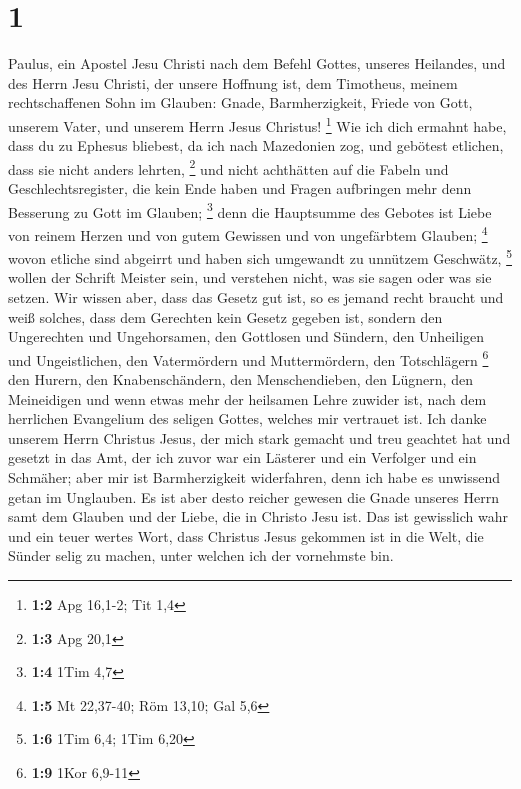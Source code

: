 \hypertarget{section}{%
\section{1}\label{section}}

 Paulus, ein Apostel Jesu Christi nach dem Befehl Gottes,
unseres Heilandes, und des Herrn Jesu Christi, der unsere Hoffnung ist,
 dem Timotheus, meinem rechtschaffenen Sohn im Glauben:
Gnade, Barmherzigkeit, Friede von Gott, unserem Vater, und unserem Herrn
Jesus Christus! \footnote{\textbf{1:2} Apg 16,1-2; Tit 1,4}
 Wie ich dich ermahnt habe, dass du zu Ephesus bliebest,
da ich nach Mazedonien zog, und gebötest etlichen, dass sie nicht anders
lehrten, \footnote{\textbf{1:3} Apg 20,1}  und nicht
achthätten auf die Fabeln und Geschlechtsregister, die kein Ende haben
und Fragen aufbringen mehr denn Besserung zu Gott im Glauben;
\footnote{\textbf{1:4} 1Tim 4,7}  denn die Hauptsumme des
Gebotes ist Liebe von reinem Herzen und von gutem Gewissen und von
ungefärbtem Glauben; \footnote{\textbf{1:5} Mt 22,37-40; Röm 13,10; Gal
  5,6}  wovon etliche sind abgeirrt und haben sich
umgewandt zu unnützem Geschwätz, \footnote{\textbf{1:6} 1Tim 6,4; 1Tim
  6,20}  wollen der Schrift Meister sein, und verstehen
nicht, was sie sagen oder was sie setzen.  Wir wissen
aber, dass das Gesetz gut ist, so es jemand recht braucht 
und weiß solches, dass dem Gerechten kein Gesetz gegeben ist, sondern
den Ungerechten und Ungehorsamen, den Gottlosen und Sündern, den
Unheiligen und Ungeistlichen, den Vatermördern und Muttermördern, den
Totschlägern \footnote{\textbf{1:9} 1Kor 6,9-11}  den
Hurern, den Knabenschändern, den Menschendieben, den Lügnern, den
Meineidigen und wenn etwas mehr der heilsamen Lehre zuwider ist,
 nach dem herrlichen Evangelium des seligen Gottes,
welches mir vertrauet ist.  Ich danke unserem Herrn
Christus Jesus, der mich stark gemacht und treu geachtet hat und gesetzt
in das Amt,  der ich zuvor war ein Lästerer und ein
Verfolger und ein Schmäher; aber mir ist Barmherzigkeit widerfahren,
denn ich habe es unwissend getan im Unglauben.  Es ist
aber desto reicher gewesen die Gnade unseres Herrn samt dem Glauben und
der Liebe, die in Christo Jesu ist.  Das ist gewisslich
wahr und ein teuer wertes Wort, dass Christus Jesus gekommen ist in die
Welt, die Sünder selig zu machen, unter welchen ich der vornehmste bin.
